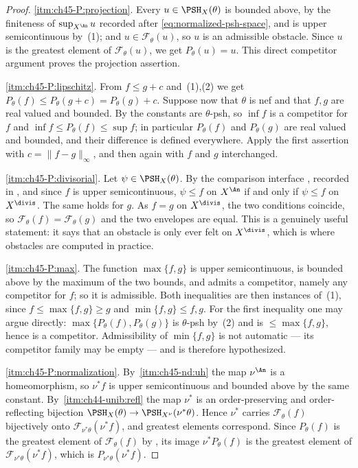 \begin{proof}
\cref{itm:ch45-P:projection}.  Every $u\in\PSH_X(\theta)$ is bounded above,
by the finiteness of $\sup_{X^{\An}}u$ recorded after
\eqref{eq:normalized-psh-space}, and is upper semicontinuous by
\,(1); and $u\in\mathcal F_\theta(u)$, so $u$ is an admissible
obstacle.  Since $u$ is the greatest element of $\mathcal F_\theta(u)$, we get
$P_\theta(u)=u$.  This direct competitor argument proves the projection assertion.

\cref{itm:ch45-P:lipschitz}.  From $f\le g+c$ and
\,(1),(2) we get
$P_\theta(f)\le P_\theta(g+c)=P_\theta(g)+c$.  Suppose now that
$\theta$ is nef and that $f,g$ are real valued and bounded.  By
 the constants are $\theta$-psh, so
$\inf f$ is a competitor for $f$ and $\inf f\le P_\theta(f)\le\sup f$;
in particular $P_\theta(f)$ and $P_\theta(g)$ are real valued and
bounded, and their difference is defined everywhere.  Apply the first
assertion with $c=\lVert f-g\rVert_\infty$, and then again with $f$ and
$g$ interchanged.

\cref{itm:ch45-P:divisorial}.  Let $\psi\in\PSH_X(\theta)$.  By the
comparison interface \cite[Theorem~4.22]{BJ22}, recorded in
, and since $f$ is upper semicontinuous,
$\psi\le f$ on $X^{\An}$ if and only if $\psi\le f$ on
$X^{\divis}$.  The same holds for $g$.  As $f=g$ on $X^{\divis}$,
the two conditions coincide, so $\mathcal F_\theta(f)=\mathcal F_\theta(g)$ and the two
envelopes are equal.  This is a genuinely useful statement: it says that an
obstacle is only ever felt on $X^{\divis}$, which is where obstacles are
computed in practice.

\cref{itm:ch45-P:max}.  The function $\max\{f,g\}$ is upper
semicontinuous, is bounded above by the maximum of the two bounds, and
admits a competitor, namely any competitor for $f$; so it is admissible.
Both inequalities are then instances of
\,(1), since $f\le\max\{f,g\}\ge g$
and $\min\{f,g\}\le f,g$.  For the first inequality one may argue
directly: $\max\{P_\theta(f),P_\theta(g)\}$ is $\theta$-psh by
\,(2) and is $\le\max\{f,g\}$, hence is a
competitor.  Admissibility of $\min\{f,g\}$ is not automatic --- its
competitor family may be empty --- and is therefore hypothesized.

\cref{itm:ch45-P:normalization}.  By
\,\cref{itm:ch45-nd:uh} the map
$\nu^{\An}$ is a homeomorphism, so $\nu^*f$ is upper semicontinuous and
bounded above by the same constant.  By
\,\cref{itm:ch44-unib:refl}
the map $\nu^*$ is an order-preserving and order-reflecting bijection
$\PSH_X(\theta)\to\PSH_{X^\nu}(\nu^*\theta)$.  Hence
$\nu^*$ carries $\mathcal F_\theta(f)$ bijectively onto
$\mathcal F_{\nu^*\theta}(\nu^*f)$, and greatest elements correspond.  Since
$P_\theta(f)$ is the greatest element of $\mathcal F_\theta(f)$ by
, its image $\nu^*P_\theta(f)$ is the
greatest element of $\mathcal F_{\nu^*\theta}(\nu^*f)$, which is
$P_{\nu^*\theta}(\nu^*f)$.


\end{proof}
